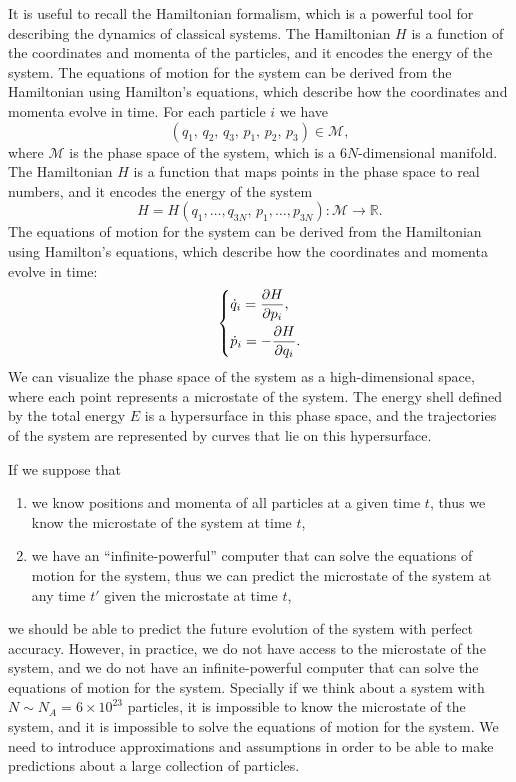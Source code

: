 It is useful to recall the Hamiltonian formalism, which is a powerful tool for describing the dynamics of classical systems. The Hamiltonian \(H\) is a function of the coordinates and momenta of the particles, and it encodes the energy of the system. The equations of motion for the system can be derived from the Hamiltonian using Hamilton's equations, which describe how the coordinates and momenta evolve in time. For each particle \(i\) we have
\[
    \left( q_1,\, q_2,\, q_3,\, p_1,\, p_2,\, p_3 \right) \in \mathcal{M},
\]
where \(\mathcal{M}\) is the phase space of the system, which is a \(6N\)-dimensional manifold. The Hamiltonian \(H\) is a function that maps points in the phase space to real numbers, and it encodes the energy of the system
\[
    H = H(q_1,\ldots,q_{3N},\,p_1,\ldots,p_{3N}) : \mathcal{M} \to \mathbb{R}.
\]
The equations of motion for the system can be derived from the Hamiltonian using Hamilton's equations, which describe how the coordinates and momenta evolve in time:
\[
    \begin{dcases}
        \dot{q}_i = \frac{\partial H}{\partial p_i}, \\
        \dot{p}_i = -\frac{\partial H}{\partial q_i}.
    \end{dcases}
\]
We can visualize the phase space of the system as a high-dimensional space, where each point represents a microstate of the system. The energy shell defined by the total energy \(E\) is a hypersurface in this phase space, and the trajectories of the system are represented by curves that lie on this hypersurface.

If we suppose that
\begin{enumerate}
    \item we know positions and momenta of all particles at a given time \(t\), thus we know the microstate of the system at time \(t\),
    \item we have an ``infinite-powerful'' computer that can solve the equations of motion for the system, thus we can predict the microstate of the system at any time \(t'\) given the microstate at time \(t\),
\end{enumerate}
we should be able to predict the future evolution of the system with perfect accuracy. However, in practice, we do not have access to the microstate of the system, and we do not have an infinite-powerful computer that can solve the equations of motion for the system. Specially if we think about a system with \(N \sim N_A = 6 \times 10^{23}\) particles, it is impossible to know the microstate of the system, and it is impossible to solve the equations of motion for the system. We need to introduce approximations and assumptions in order to be able to make predictions about a large collection of particles.

